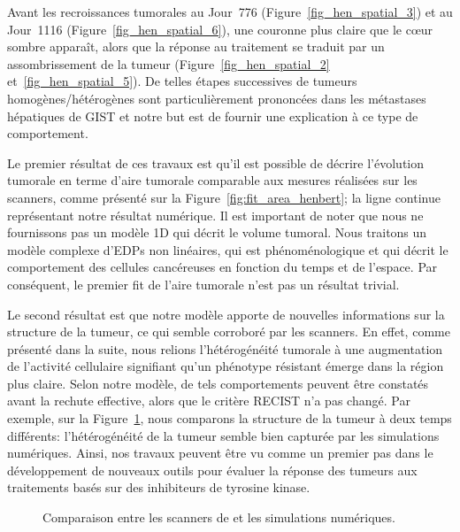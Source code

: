 \documentclass[main.tex]{subfiles}
\begin{document}
Avant les recroissances tumorales au Jour~776 (Figure~\ref{fig_hen_spatial_3})
et au Jour~1116 (Figure~\ref{fig_hen_spatial_6}), une couronne plus claire que le c\oe{}ur sombre apparaît, alors que la réponse au traitement se traduit par un assombrissement de la tumeur (\cf Figure~\ref{fig_hen_spatial_2} et~\ref{fig_hen_spatial_5}). 
De telles étapes successives de tumeurs homogènes/hétérogènes sont particulièrement prononcées dans les métastases hépatiques de GIST et notre but est de fournir une explication à ce type de comportement.


Le premier résultat de ces travaux est qu'il est possible de décrire l'évolution tumorale en terme d'aire tumorale comparable aux mesures réalisées sur les scanners, comme présenté sur la  Figure~\ref{fig:fit_area_henbert}; la ligne continue représentant notre résultat numérique. Il est important de noter que nous ne fournissons pas un modèle 1D qui décrit le volume tumoral. Nous traitons un modèle complexe d'EDPs non linéaires, qui est phénoménologique et qui décrit le comportement des cellules cancéreuses en fonction du temps et de l'espace. Par conséquent, le premier fit de l'aire tumorale n'est pas un résultat trivial.


Le second résultat est que notre modèle apporte de nouvelles informations sur la structure de la tumeur, ce qui semble corroboré par les scanners. En effet, comme présenté dans la suite, nous relions l'hétérogénéité tumorale à une augmentation de l'activité cellulaire signifiant qu'un phénotype résistant émerge dans la région plus claire. Selon notre modèle, de tels comportements peuvent être constatés avant la rechute effective, alors que le critère RECIST n'a pas changé. Par exemple, sur la Figure~\ref{fig:compare_spatial_nber}, 
nous comparons la structure de la tumeur à deux temps différents: l'hétérogénéité de la tumeur semble bien capturée par les simulations numériques. Ainsi, nos travaux peuvent être vu comme un premier pas dans le développement de nouveaux outils pour évaluer la réponse des tumeurs aux traitements  basés sur des inhibiteurs de tyrosine kinase.

\begin{figure}[htpb]
\vspace{-1cm}
\caption{\label{fig:compare_spatial_nber}
Comparaison entre les scanners de \Nber et les simulations numériques.
}
\end{figure}
\end{document}
